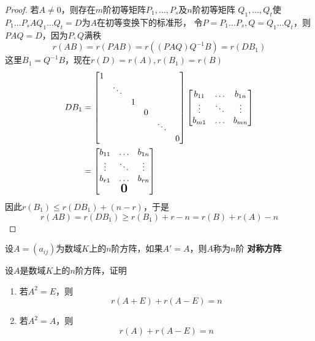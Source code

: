 \documentclass[11pt]{article}
\begin{document}
\begin{proof}
若\(A\neq0\)，则存在\(m\)阶初等矩阵\(P_1,\dots,P_s\)及\(n\)阶初等矩阵
\(Q_1,\dots,Q_t\)使\(P_1\dots P_sAQ_1\dots Q_t=D\)为\(A\)在初等变换下的标准形，
令\(P=P_1\dots P_s,Q=Q_1\dots Q_t\)，则\(PAQ=D\)，因为\(P,Q\)满秩
\begin{equation*}
r(AB)=r(PAB)=r((PAQ)Q^{-1}B)=r(DB_1)
\end{equation*}
这里\(B_1=Q^{-1}B\)，现在\(r(D)=r(A),r(B_1)=r(B)\)
\begin{align*}
DB_1&=
\begin{bmatrix}
1&&&&&\\
&\ddots&&&&\\
&&1&&&\\
&&&0&&\\
&&&&\ddots&\\
&&&&&0
\end{bmatrix}
\begin{bmatrix}
b_{11}&\dots&b_{1n}\\
\vdots&\ddots&\vdots\\
b_{m1}&\dots&b_{mn}\\
\end{bmatrix}\\
&=
\begin{bmatrix}
b_{11}&\dots&b_{1n}\\
\vdots&\ddots&\vdots\\
b_{r1}&\dots&b_{rn}\\
&\mbox{\normalfont\Large\bfseries 0}&
\end{bmatrix}
\end{align*}
因此\(r(B_1)\le r(DB_1)+(n-r)\)，于是
\begin{equation*}
r(AB)=r(DB_1)\ge r(B_1)+r-n=r(B)+r(A)-n
\end{equation*}
\end{proof}


设\(A=(a_{ij})\)为数域\(K\)上的\(n\)阶方阵，如果\(A'=A\)，则\(A\)称为\(n\)阶
\textbf{对称方阵}

\begin{exercise}
设\(A\)是数域\(K\)上的\(n\)阶方阵，证明
\begin{enumerate}
\item 若\(A^2=E\)，则
\begin{equation*}
r(A+E)+r(A-E)=n
\end{equation*}
\item 若\(A^2=A\)，则
\begin{equation*}
r(A)+r(A-E)=n
\end{equation*}
\end{enumerate}
\end{exercise}
\end{document}
